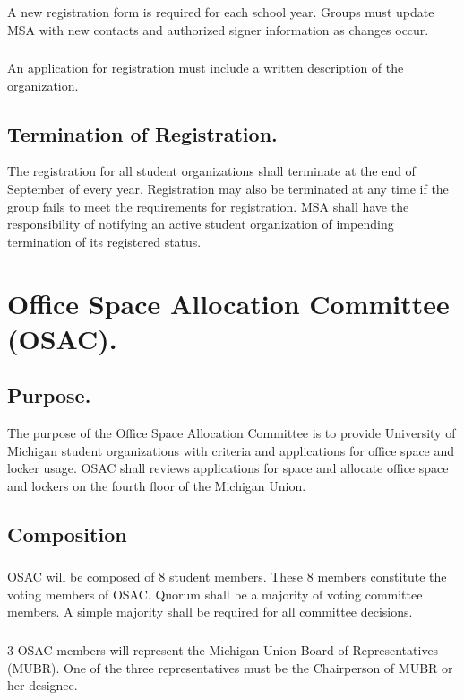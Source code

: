 \subsubsection{}
A new registration form is required for each school year.
Groups must update MSA with new contacts and authorized signer information as changes occur.
\subsubsection{}
An application for registration must include a written description of the organization.

\subsection{Termination of Registration.}
The registration for all student organizations shall terminate at the end of September of every year.  Registration may also be terminated at any time if the group fails to meet the requirements for registration.  MSA shall have the responsibility of notifying an active student organization of impending termination of its registered status.


\section{Office Space Allocation Committee (OSAC).}
\subsection{Purpose.}
The purpose of the Office Space Allocation Committee is to provide University of Michigan student organizations with criteria and applications for office space and locker usage.  OSAC shall reviews applications for space and allocate office space and lockers on the fourth floor of the Michigan Union.

\subsection{Composition}
\subsubsection{}
OSAC will be composed of 8 student members.  These 8 members constitute the voting members of OSAC.  Quorum shall be a majority of voting committee members.  A simple majority shall be required for all committee decisions.
\subsubsection{}
3 OSAC members will represent the Michigan Union Board of Representatives (MUBR).  One of the three representatives must be the Chairperson of MUBR or her designee.
